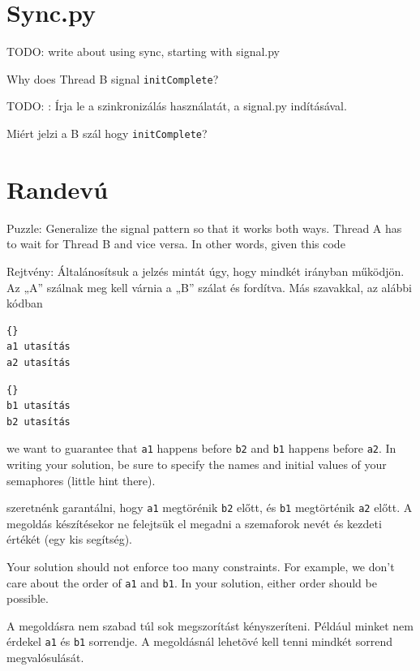 \documentclass{book}
\begin{document}
\section{Sync.py}
\label{sync.py}

TODO: write about using sync, starting with signal.py

Why does Thread B signal {\tt initComplete}?

TODO: : Írja le a szinkronizálás használatát, a signal.py indításával.

Miért jelzi a B szál hogy  {\tt initComplete}?


\section{Randevú}
\label{rendezvous}

Puzzle: Generalize the signal pattern so that it works both
ways.  Thread A has to wait for Thread B and vice versa.  In other
words, given this code

Rejtvény: Általánosítsuk a jelzés mintát úgy, hogy mindkét irányban működjön.
Az „A” szálnak meg kell várnia a „B” szálat és fordítva. Más szavakkal,
az alábbi kódban


\begin{minipage}[t]{2in}
\begin{lstlisting}[title={„A” szál}]{}
a1 utasítás
a2 utasítás
\end{lstlisting}
\end{minipage}
\hfill
\begin{minipage}[t]{2in}
\begin{lstlisting}[title={„B” szál}]{}
b1 utasítás
b2 utasítás
\end{lstlisting}
\end{minipage}
%
we want to guarantee that {\tt a1} happens before {\tt b2} and
{\tt b1} happens before {\tt a2}.  In writing your solution, be sure
to specify the names and initial values of your semaphores
(little hint there).

szeretnénk garantálni, hogy {\tt a1} megtörénik {\tt b2} előtt, és
{\tt b1} megtörténik {\tt a2} előtt. A megoldás készítésekor ne felejtsük
el megadni a szemaforok nevét és kezdeti értékét (egy kis segítség).

Your solution should not enforce too many constraints.  For example,
we don't care about the order of {\tt a1} and {\tt b1}.  In your
solution, either order should be possible.

A megoldásra nem szabad túl sok megszorítást kényszeríteni. Például
minket nem érdekel {\tt a1} és {\tt b1} sorrendje. A megoldásnál
lehetõvé kell tenni mindkét sorrend megvalósulását.
\end{document}

